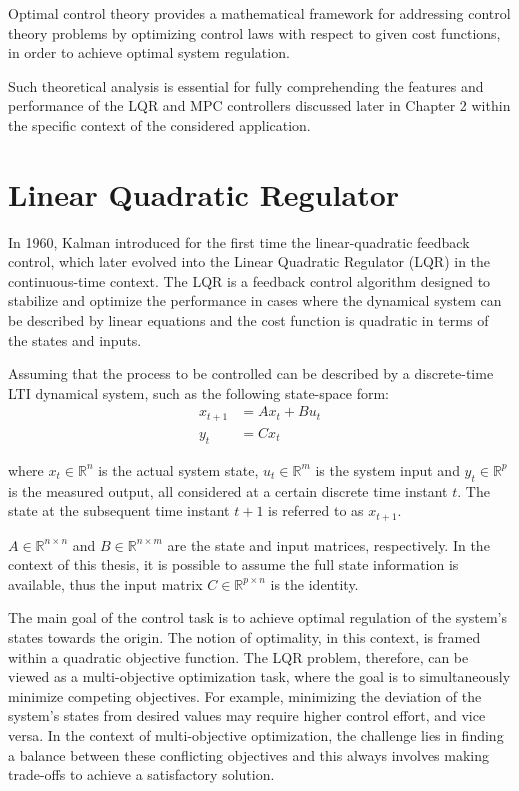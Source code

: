\documentclass[a4paper,12pt,oneside]{book}
\begin{document}
Optimal control theory provides a mathematical framework for addressing control theory problems by optimizing control laws with respect to given cost functions, in order to achieve optimal system regulation.

Such theoretical analysis is essential for fully comprehending the features and performance of the LQR and MPC controllers discussed later in Chapter 2 within the specific context of the considered application.

\section{Linear Quadratic Regulator}
In 1960, Kalman introduced for the first time the linear-quadratic feedback control, which later evolved into the Linear Quadratic Regulator (LQR) \cite{kalman_contributions} in the continuous-time context. 
The LQR is a feedback control algorithm designed to stabilize and optimize the performance in cases where the dynamical system can be described by linear equations and the cost function is quadratic in terms of the states and inputs. 

\bigskip
Assuming that the process to be controlled can be described by a discrete-time LTI dynamical system, such as the following state-space form:
\begin{equation} 
\begin{aligned}
    x_{t+1} &= A x_t + B u_t \\
    y_t &= C x_t
\end{aligned}
\label{eq:Linear_model}
\end{equation}

where $x_t \in \mathbb{R}^n$ is the actual system state, $u_t \in \mathbb{R}^m$ is the system input and $y_t \in \mathbb{R}^p$ is the measured output, all considered at a certain discrete time instant $t$. 
The state at the subsequent time instant $t+1$ is referred to as $x_{t+1}$.

$A \in \mathbb{R}^{n\times n}$ and $B\in \mathbb{R}^{n\times m}$ are the state and input matrices, respectively.
In the context of this thesis, it is possible to assume the full state information is available, thus the input matrix $C \in \mathbb{R}^{p\times n}$ is the identity. 

\bigskip
The main goal of the control task is to achieve optimal regulation of the system's states towards the origin. 
The notion of optimality, in this context, is framed within a quadratic objective function.
The LQR problem, therefore, can be viewed as a multi-objective optimization task, where the goal is to simultaneously minimize competing objectives.
For example, minimizing the deviation of the system's states from desired values may require higher control effort, and vice versa.
In the context of multi-objective optimization, the challenge lies in finding a balance between these conflicting objectives and this always involves making trade-offs to achieve a satisfactory solution.
\end{document}
